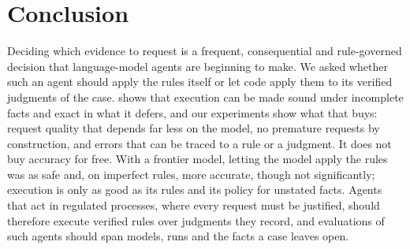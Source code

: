 \section{Conclusion}
\label{sec:conclusion}

Deciding which evidence to request is a frequent, consequential and rule-governed decision that language-model agents are beginning to make. We asked whether such an agent should apply the rules itself or let code apply them to its verified judgments of the case. \casepath shows that execution can be made sound under incomplete facts and exact in what it defers, and our experiments show what that buys: request quality that depends far less on the model, no premature requests by construction, and errors that can be traced to a rule or a judgment. It does not buy accuracy for free. With a frontier model, letting the model apply the rules was as safe and, on imperfect rules, more accurate, though not significantly; execution is only as good as its rules and its policy for unstated facts. Agents that act in regulated processes, where every request must be justified, should therefore execute verified rules over judgments they record, and evaluations of such agents should span models, runs and the facts a case leaves open.

